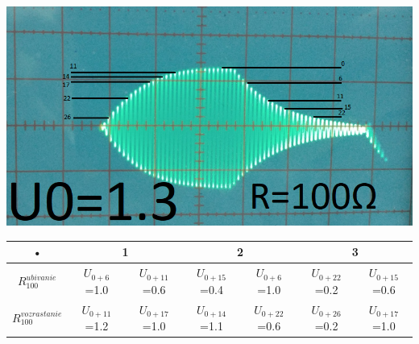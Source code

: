\documentclass[a4paper,12pt]{article} %
\begin{document}
\begin{center}





\includegraphics[scale=1.0]{r0}\\
\end{center}			
\begin{tabular}{|c|c|c|c|c|c|c|}
\hline 
• &\multicolumn{2}{|c|}{1} & \multicolumn{2}{|c|}{2} & \multicolumn{2}{|c|}{3} \\ 
\hline 
$R_{100}^{ubivanie}$ &$U_{0+6}$=1.0 & $U_{0+11}$=0.6 & $U_{0+15}$=0.4 & $U_{0+6}$=1.0 & $U_{0+22}$=0.2 & $U_{0+15}$=0.6 \\ 
\hline 
$R_{100}^{vozrastanie}$ &$U_{0+11}$=1.2 & $U_{0+17}$=1.0 & $U_{0+14}$=1.1 & $U_{0+22}$=0.6 & $U_{0+26}$=0.2 & $U_{0+17}$=1.0 \\ 
\hline 

\end{tabular}  \\
\end{document}
